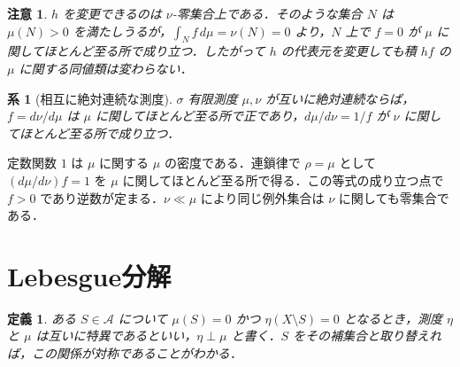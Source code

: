 \documentclass[a5paper,10pt,onecolumn]{jsarticle}
\makeatletter
\theoremstyle{mathnotetheorem}
\newtheorem{definition}[theorem]{定義}
\newtheorem{corollary}[theorem]{系}
\newtheorem{remark}[theorem]{注意}
\renewcommand{\proofname}{証明}
\renewenvironment{proof}[1][\proofname]{%
  \par\pushQED{\qed}\normalfont\topsep4\p@\@plus2\p@\relax
  \trivlist\item[\hskip\labelsep\bfseries #1]\ignorespaces
}{\popQED\endtrivlist\@endpefalse}
\makeatother
\begin{document}
\begin{remark}
$h$ を変更できるのは $\nu$-零集合上である．そのような集合 $N$ は $\mu(N)>0$ を満たしうるが，$\int_N f\,d\mu=\nu(N)=0$ より，$N$ 上で $f=0$ が $\mu$ に関してほとんど至る所で成り立つ．したがって $h$ の代表元を変更しても積 $hf$ の $\mu$ に関する同値類は変わらない．
\end{remark}

\begin{corollary}[相互に絶対連続な測度]
$\sigma$ 有限測度 $\mu,\nu$ が互いに絶対連続ならば，$f=d\nu/d\mu$ は $\mu$ に関してほとんど至る所で正であり，$d\mu/d\nu=1/f$ が $\nu$ に関してほとんど至る所で成り立つ．
\end{corollary}
\begin{proof}
定数関数 $1$ は $\mu$ に関する $\mu$ の密度である．連鎖律で $\rho=\mu$ として $(d\mu/d\nu)f=1$ を $\mu$ に関してほとんど至る所で得る．この等式の成り立つ点で $f>0$ であり逆数が定まる．$\nu\ll\mu$ により同じ例外集合は $\nu$ に関しても零集合である．
\end{proof}

\section{Lebesgue分解}

\begin{definition}
ある $S\in\mathcal A$ について $\mu(S)=0$ かつ $\eta(X\setminus S)=0$ となるとき，測度 $\eta$ と $\mu$ は互いに特異であるといい，$\eta\perp\mu$ と書く．$S$ をその補集合と取り替えれば，この関係が対称であることがわかる．
\end{definition}
\end{document}
